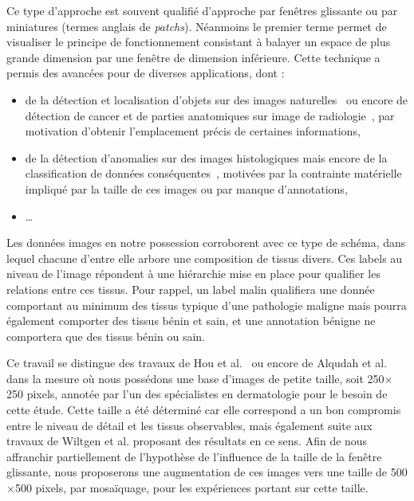 Ce type d'approche est souvent qualifié d'approche par fenêtres glissante ou par miniatures (termes anglais de \textit{patchs}). Néanmoins le premier terme permet de visualiser le principe de fonctionnement consistant à balayer un espace de plus grande dimension par une fenêtre de dimension inférieure. Cette technique a permis des avancées pour de diverses applications, dont : 
\begin{itemize}
    \item de la détection et localisation d'objets sur des images naturelles~\cite{Harzallah2009} ou encore de détection de cancer et de parties anatomiques sur image de radiologie~\cite{Helwan2017}, par motivation d'obtenir l'emplacement précis de certaines informations,
    \item de la détection d'anomalies sur des images histologiques mais encore de la classification de données conséquentes~\cite{Hou2016,Alqudah2019,Wei2019}, motivées par la contrainte matérielle impliqué par la taille de ces images ou par manque d'annotations,
    \item \ldots
\end{itemize}\par

Les données images en notre possession corroborent avec ce type de schéma, dans lequel chacune d'entre elle arbore une composition de tissus divers. Ces labels au niveau de l'image répondent à une hiérarchie mise en place pour qualifier les relations entre ces tissus. Pour rappel, un label malin qualifiera une donnée comportant au minimum des tissus typique d'une pathologie maligne mais pourra également comporter des tissus bénin et sain, et une annotation bénigne ne comportera que des tissus bénin ou sain.\par

Ce travail se distingue des travaux de Hou et al.~\cite{Hou2016} ou encore de Alqudah et al.~\cite{Alqudah2019} dans la mesure où nous possédons une base d'images de petite taille, soit 250$\times$250 pixels, annotée par l'un des spécialistes en dermatologie pour le besoin de cette étude. Cette taille a été déterminé car elle correspond a un bon compromis entre le niveau de détail et les tissus observables, mais également suite aux travaux de Wiltgen et al.\cite{Wiltgen2008} proposant des résultats en ce sens. Afin de nous affranchir partiellement de l'hypothèse de l'influence de la taille de la fenêtre glissante, nous proposerons une augmentation de ces images vers une taille de 500$\times$500 pixels, par mosaïquage, pour les expériences portant sur cette taille.\par

